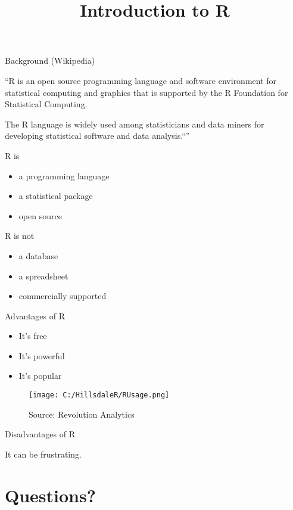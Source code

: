 \documentclass[ignorenonframetext,]{beamer}
\title{Introduction to R}
\date{}
\providecommand{\tightlist}{%
  \setlength{\itemsep}{0pt}\setlength{\parskip}{0pt}}
\begin{document}
\frame{\titlepage}

\begin{frame}{Background (Wikipedia)}

``R is an open source programming language and software environment for
statistical computing and graphics that is supported by the R Foundation
for Statistical Computing.

The R language is widely used among statisticians and data miners for
developing statistical software and data analysis.``''

\end{frame}

\begin{frame}{R is}

\begin{itemize}[<+->]
\tightlist
\item
  a programming language
\item
  a statistical package
\item
  open source
\end{itemize}

\end{frame}

\begin{frame}{R is not}

\begin{itemize}[<+->]
\tightlist
\item
  a database
\item
  a spreadsheet
\item
  commercially supported
\end{itemize}

\end{frame}

\begin{frame}{Advantages of R}

\begin{itemize}[<+->]
\tightlist
\item
  It's free
\item
  It's powerful
\item
  It's popular
\end{itemize}

\end{frame}

\begin{frame}

\begin{block}{}

\begin{figure}
\centering
\texttt{[image: C:/HillsdaleR/RUsage.png]}
\caption{Source: Revolution Analytics}
\end{figure}

\end{block}

\end{frame}

\begin{frame}{Disadvantages of R}

It can be frustrating.

\begin{block}{}

\emph{}

\end{block}

\end{frame}

\section{Questions?}\label{questions}
\end{document}
